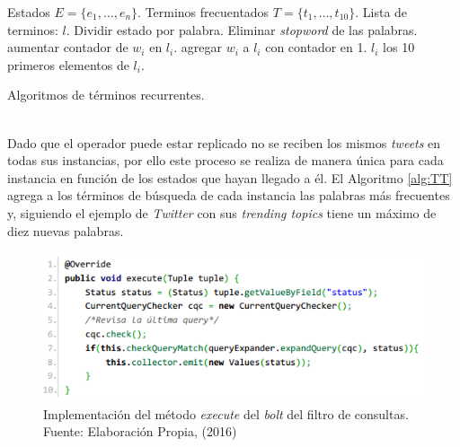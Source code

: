 \begin{algorithm}[H]
	\begin{algorithmic}
		\REQUIRE Estados $E=\{e_{1}, \dots, e_{n} \}$.
		\ENSURE Terminos frecuentados $T=\{t_{1}, \dots, t_{10} \}$.
		\STATE Lista de terminos: $l$.
			\STATE Dividir estado por palabra.
			\STATE Eliminar \textit{stopword} de las palabras.
					\STATE aumentar contador de $w_{i}$ en $l_{i}$.
				\ELSE
					\STATE agregar $w_{i}$ a $l_{i}$ con contador en 1.
				\ENDIF		
			\ENDFOR
		\ENDFOR
			\RETURN $l_{i}$
		\ELSE
			\RETURN los 10 primeros elementos de $l_{i}$.
		\ENDIF
	\end{algorithmic}
	\caption{Algoritmos de términos recurrentes.}
	\label{alg:TT}
\end{algorithm}\vphantom\\

Dado que el operador puede estar replicado no se reciben los mismos \textit{tweets} en todas sus instancias, por ello este proceso se realiza de manera única para cada instancia en función de los estados que hayan llegado a él. El Algoritmo \ref{alg:TT} agrega a los términos de búsqueda de cada instancia las palabras más frecuentes y, siguiendo el ejemplo de \textit{Twitter} con sus \textit{trending topics} tiene un máximo de diez nuevas palabras.

\begin{figure}[H]
	\centering
	\captionsetup{justification=centering}
	\includegraphics[scale=0.8]{images/FilterBolt.png}
	\caption[Implementación del método \textit{execute} del \textit{bolt} del filtro de consultas.]{Implementación del método \textit{execute} del \textit{bolt} del filtro de consultas.\\Fuente: Elaboración Propia, (2016)}
	\label{fig:operadorFiltro}
\end{figure}

